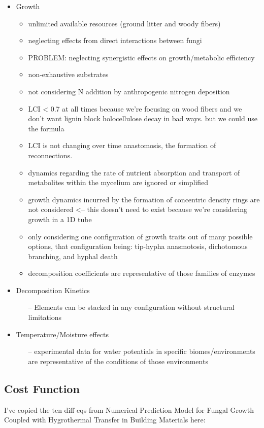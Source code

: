 \documentclass[12pt]{article}
\begin{document}
\begin{multicols}{2}
\begin{itemize}
	\item Growth
	\begin{itemize}
		\item unlimited available resources (ground litter and woody fibers)
		\item neglecting effects from direct interactions between fungi
		\item PROBLEM: neglecting synergistic effects on growth/metabolic efficiency
		\item non-exhaustive substrates
		\item not considering N addition by anthropogenic nitrogen deposition
		\item LCI < 0.7 at all times because we're focusing on wood fibers and we don't want lignin block holocellulose decay in bad ways. but we could use the formula
		\item LCI is not changing over time anastomosis, the formation of reconnections. 
		\item dynamics regarding the rate of nutrient absorption and transport of metabolites within the
		mycelium are ignored or simplified
		\item growth dynamics incurred by the formation of concentric density rings are not considered <-- this doesn't need to exist because we're considering growth in a 1D tube
		\item only considering one configuration of growth traits out of many possible options, that configuration being: tip-hypha anasmotosis, dichotomous branching, and hyphal death
		\item decomposition coefficients are representative of those families of enzymes
	\end{itemize}
	\item Decomposition Kinetics
	\begin{itemize}
		\item[--] Elements can be stacked in any configuration without structural limitations
	\end{itemize}
	\item Temperature/Moisture effects
	\begin{itemize}
		\item[--] experimental data for water potentials in specific biomes/environments are representative of the conditions of those environments 
	\end{itemize}
\end{itemize}


\subsection{Cost Function}
I've copied the ten diff eqs from Numerical Prediction Model for Fungal Growth Coupled with Hygrothermal Transfer in Building Materials here:


\end{multicols}
\end{document}
